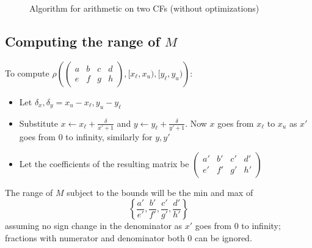 \documentclass[11pt, oneside]{amsart}   	%
\newcommand{\bihomographic}[8]{\left(\begin{smallmatrix}#1&#2&#3&#4\\#5&#6&#7&#8\end{smallmatrix}\right)}
\newcommand{\abcd}{\left(
\begin{smallmatrix} 
a & b & c & d\\ 
e & f & g & h
\end{smallmatrix}
\right)}
\renewcommand{\:}{\negthickspace:\negthickspace}
\begin{document}

\begin{figure}\label{fig:twoCFarith}
\begin{algorithmic}
\STATE{}
\STATE{}
\STATE{}
 
 
 
    \STATE{}
     \IF{$x_i = [a,a+1)$ (where $a$ is an integer)} 
         \STATE{$I_x \gets [1,\infty)$}
     \ELSE    
     \ENDIF
          \IF{$y_i = [a,a+1)$ (where $a$ is an integer)} 
         \STATE{$I_y \gets [1,\infty)$}
     \ELSE    
     \ENDIF
     
     \STATE{}
          \STATE{$z_j \gets [a,a+1)$}    
     \ELSE
     \ENDIF
\ENDWHILE
\end{algorithmic}
\caption{Algorithm for arithmetic on two CFs (without optimizations)}
\end{figure}


\subsection{Computing the range of $M$}\label{sec:ComputeBounds}
To compute $\rho\left(\abcd, [x_{\ell}, x_u),  [y_{\ell}, y_u)\right)$:
\begin{itemize}
\item Let $\delta_x, \delta_y = x_u - x_{\ell}, y_u - y_{\ell}$
\item Substitute $x \leftarrow x_{\ell} + \frac{\delta}{x'+1}$ and $y \leftarrow y_{\ell} + \frac{\delta}{y'+1}$.
Now $x$ goes from $x_{\ell}$ to $x_u$ as $x'$ goes from 0 to infinity, similarly for $y,y'$
\item Let the coefficients of the resulting matrix be $\bihomographic{a'}{b'}{c'}{d'}{e'}{f'}{g'}{h'}$
\end{itemize}
The range of $M$ subject to the bounds will be the min and max of 
\[
\left\{ \frac{a'}{e'},\frac{b'}{f'},\frac{c'}{g'},\frac{d'}{h'} \right\}
\]
assuming no sign change in the denominator as $x'$ goes from 0 to infinity; fractions with numerator and denominator both $0$ can be ignored.
\end{document}

